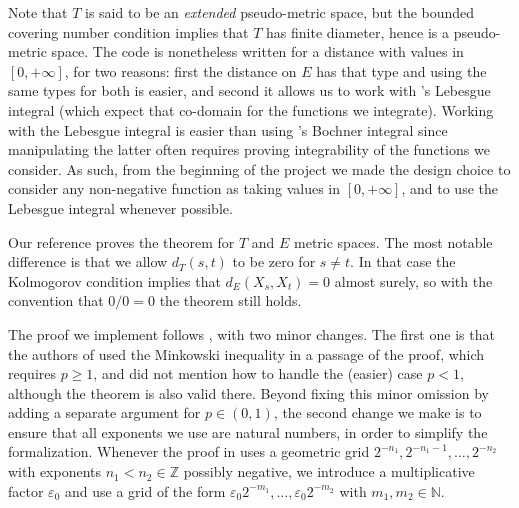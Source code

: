\documentclass[lean]{Draft}
\begin{document}


Note that $T$ is said to be an \emph{extended} pseudo-metric space, but the bounded covering number condition implies that $T$ has finite diameter, hence is a pseudo-metric space.
The \Lean code is nonetheless written for a distance with values in $[0,+\infty]$, for two reasons: first the distance on $E$ has that type and using the same types for both is easier, and second it allows us to work with \mathlib's Lebesgue integral (which expect that co-domain for the functions we integrate).
Working with the Lebesgue integral is easier than using \mathlib's Bochner integral since manipulating the latter often requires proving integrability of the functions we consider.
As such, from the beginning of the project we made the design choice to consider any non-negative function as taking values in $[0,+\infty]$, and to use the Lebesgue integral whenever possible.

Our reference \cite{kratschmer2023kolmogorov} proves the theorem for $T$ and $E$ metric spaces.
The most notable difference is that we allow $d_T(s, t)$ to be zero for $s \ne t$.
In that case the Kolmogorov condition implies that $d_E(X_s, X_t) = 0$ almost surely, so with the convention that $0/0 = 0$ the theorem still holds.



The proof we implement follows \cite{kratschmer2023kolmogorov}, with two minor changes.
The first one is that the authors of \cite{kratschmer2023kolmogorov} used the Minkowski inequality in a passage of the proof, which requires $p \ge 1$, and did not mention how to handle the (easier) case $p < 1$, although the theorem is also valid there.
Beyond fixing this minor omission by adding a separate argument for $p \in (0,1)$, the second change we make is to ensure that all exponents we use are natural numbers, in order to simplify the formalization.
Whenever the proof in \cite{kratschmer2023kolmogorov} uses a geometric grid $2^{-n_1}, 2^{-n_1-1},\ldots, 2^{-n_2}$ with exponents $n_1 < n_2 \in \mathbb{Z}$ possibly negative, we introduce a multiplicative factor $\varepsilon_0$ and use a grid of the form $\varepsilon_0 2^{-m_1}, \ldots, \varepsilon_0 2^{-m_2}$ with $m_1, m_2 \in \mathbb{N}$.
\end{document}
